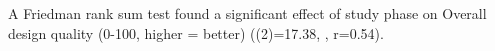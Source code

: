 A Friedman rank sum test found a significant effect of study phase on Overall design quality (0-100, higher = better) (\chisq(2)=17.38, , r=0.54). 
